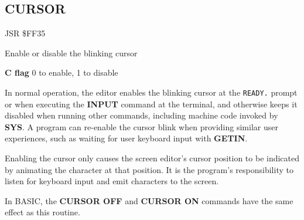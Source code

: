 \subsection{CURSOR}
\label{KERNAL Jump Table!CURSOR}
\begin{description}[leftmargin=2cm,style=nextline]
    \item [Address:] JSR \$FF35
    \item [Description:] Enable or disable the blinking cursor
    \item [Inputs:]
        \textbf{C flag} 0 to enable, 1 to disable
    \item [Remarks:]
        In normal operation, the editor enables the blinking cursor at the \texttt{READY.} prompt or when executing the {\bf INPUT} command at the terminal, and otherwise keeps it disabled when running other commands, including machine code invoked by {\bf SYS}. A program can re-enable the cursor blink when providing similar user experiences, such as waiting for user keyboard input with {\bf GETIN}.

        Enabling the cursor only causes the screen editor's cursor position to be indicated by animating the character at that position. It is the program's responsibility to listen for keyboard input and emit characters to the screen.

        In BASIC, the {\bf CURSOR OFF} and {\bf CURSOR ON} commands have the same effect as this routine.
    \item [Example:]

\end{description}



\newpage
